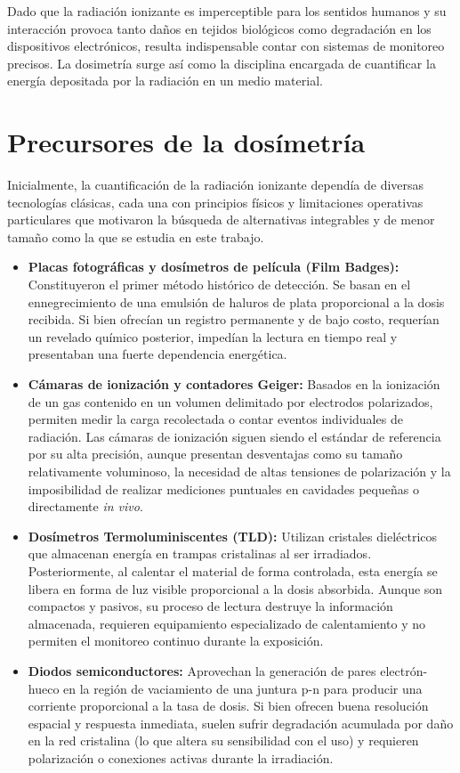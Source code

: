 \documentclass[12pt,a4paper,oneside]{book}
\begin{document}
Dado que la radiación ionizante es imperceptible para los sentidos humanos y su interacción provoca tanto daños en tejidos biológicos como degradación en los dispositivos electrónicos, resulta indispensable contar con sistemas de monitoreo precisos. La dosimetría surge así como la disciplina encargada de cuantificar la energía depositada por la radiación en un medio material.

\section{Precursores de la dosímetría}
Inicialmente, la cuantificación de la radiación ionizante dependía de diversas tecnologías clásicas, cada una con principios físicos y limitaciones operativas particulares que motivaron la búsqueda de alternativas integrables y de menor tamaño como la que se estudia en este trabajo.

\begin{itemize}
    \item \textbf{Placas fotográficas y dosímetros de película (Film Badges):} Constituyeron el primer método histórico de detección. Se basan en el ennegrecimiento de una emulsión de haluros de plata proporcional a la dosis recibida. Si bien ofrecían un registro permanente y de bajo costo, requerían un revelado químico posterior, impedían la lectura en tiempo real y presentaban una fuerte dependencia energética.
    
    \item \textbf{Cámaras de ionización y contadores Geiger:} Basados en la ionización de un gas contenido en un volumen delimitado por electrodos polarizados, permiten medir la carga recolectada o contar eventos individuales de radiación. Las cámaras de ionización siguen siendo el estándar de referencia por su alta precisión, aunque presentan desventajas como su tamaño relativamente voluminoso, la necesidad de altas tensiones de polarización y la imposibilidad de realizar mediciones puntuales en cavidades pequeñas o directamente \textit{in vivo}.
    
    \item \textbf{Dosímetros Termoluminiscentes (TLD):} Utilizan cristales dieléctricos que almacenan energía en trampas cristalinas al ser irradiados. Posteriormente, al calentar el material de forma controlada, esta energía se libera en forma de luz visible proporcional a la dosis absorbida. Aunque son compactos y pasivos, su proceso de lectura destruye la información almacenada, requieren equipamiento especializado de calentamiento y no permiten el monitoreo continuo durante la exposición.
    
    \item \textbf{Diodos semiconductores:} Aprovechan la generación de pares electrón-hueco en la región de vaciamiento de una juntura p-n para producir una corriente proporcional a la tasa de dosis. Si bien ofrecen buena resolución espacial y respuesta inmediata, suelen sufrir degradación acumulada por daño en la red cristalina (lo que altera su sensibilidad con el uso) y requieren polarización o conexiones activas durante la irradiación.
\end{itemize}
\end{document}
